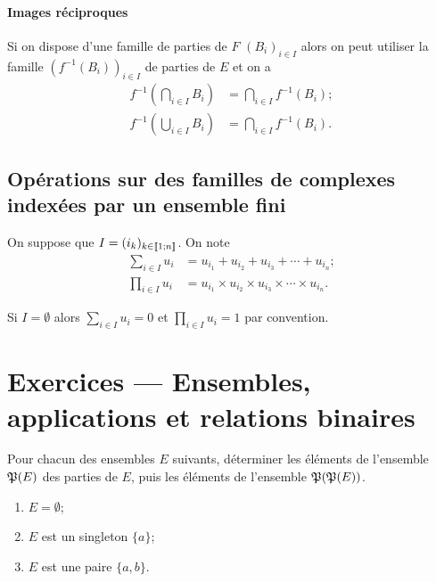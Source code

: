 \paragraph{Images réciproques}
\label{chap3-par:imagerec}

Si on dispose d'une famille de parties de \(F\) \((B_i)_{i \in I}\) alors on 
peut utiliser la famille \((f^{-1}(B_i))_{i \in I}\) de parties de \(E\) et on a
\begin{align}
    f^{-1} \left(\bigcap\limits_{i \in I} B_i\right) &= \bigcap\limits_{i \in I} 
    f^{-1}(B_i);\\
    f^{-1} \left(\bigcup\limits_{i \in I} B_i\right) &= \bigcap\limits_{i \in I} 
    f^{-1}(B_i).
\end{align}

\subsection{Opérations sur des familles de complexes indexées par un ensemble 
fini}
\label{chap3-subsec:operationsfamilles}

On suppose que \(I=(i_k)_{k \in  \mathopen{\llbracket}1\mathclose{}\mathpunct{};n\mathclose{\rrbracket}}\). On note
\begin{align}
    \sum_{i \in I} u_i &= u_{i_1} +u_{i_2} +u_{i_3} + \dotsb +u_{i_n}; \\
    \prod_{i \in I} u_i &= u_{i_1} \times u_{i_2} \times u_{i_3} \times \dotsm 
    \times u_{i_n}.
\end{align}

Si \(I=\emptyset\) alors \(\sum_{i \in I} u_i=0\) et \(\prod_{i \in I} u_i=1\) 
par convention.
\clearpage

\section{Exercices --- Ensembles, applications et relations binaires}

\begin{exercice}
    Pour chacun des ensembles \(E\) suivants, déterminer les éléments de 
    l'ensemble \(\mathfrak{P}(E)\) des parties de \(E\), puis les éléments de 
    l'ensemble \(\mathfrak{P}(\mathfrak{P}(E))\).
    \begin{enumerate}
        \item \(E=\emptyset\);
        \item \(E\) est un singleton \(\{a\}\);
        \item \(E\) est une paire \(\{a, b\}\).
    \end{enumerate}
\end{exercice}

